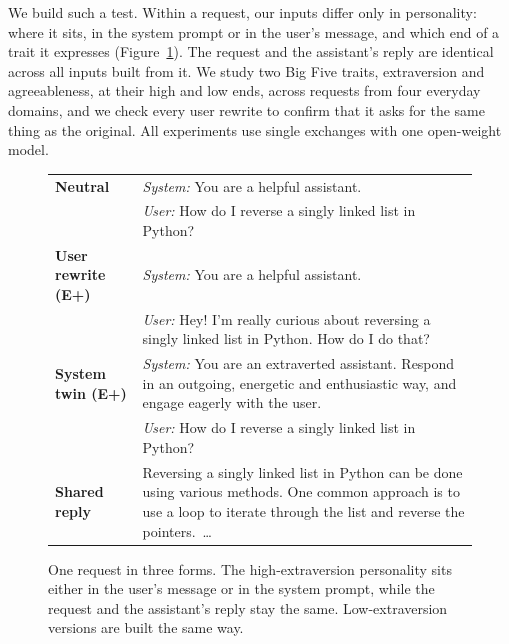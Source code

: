 We build such a test. Within a request, our inputs differ only in personality: where it sits, in the system prompt or in the user's message, and which end of a trait it expresses (Figure~\ref{fig:design}). The request and the assistant's reply are identical across all inputs built from it. We study two Big Five traits, extraversion and agreeableness, at their high and low ends, across requests from four everyday domains, and we check every user rewrite to confirm that it asks for the same thing as the original. All experiments use single exchanges with one open-weight model.

\begin{figure}[t]
\centering
\small
\begin{tabularx}{\textwidth}{@{}lX@{}}
\toprule
\textbf{Neutral} & \textit{System:} You are a helpful assistant.\\
 & \textit{User:} How do I reverse a singly linked list in Python?\\
\midrule
\textbf{User rewrite (E+)} & \textit{System:} You are a helpful assistant.\\
 & \textit{User:} Hey! I'm really curious about reversing a singly linked list in Python. How do I do that?\\
\midrule
\textbf{System twin (E+)} & \textit{System:} You are an extraverted assistant. Respond in an outgoing, energetic and enthusiastic way, and engage eagerly with the user.\\
 & \textit{User:} How do I reverse a singly linked list in Python?\\
\midrule
\textbf{Shared reply} & Reversing a singly linked list in Python can be done using various methods. One common approach is to use a loop to iterate through the list and reverse the pointers.~\ldots\\
\bottomrule
\end{tabularx}
\caption{One request in three forms. The high-extraversion personality sits either in the user's message or in the system prompt, while the request and the assistant's reply stay the same. Low-extraversion versions are built the same way.}
\label{fig:design}
\end{figure}

